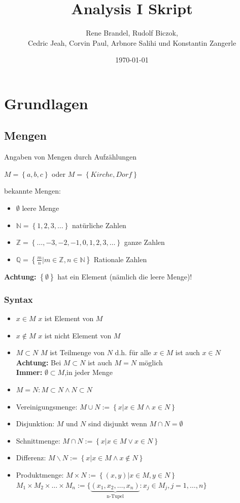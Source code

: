 \documentclass[fleqn]{scrbook}
\newcommand{\titleText}{Analysis I Skript}
\newcommand{\mainAuthor}{Rene Brandel, Rudolf Biczok, \texorpdfstring{\\}{} Cedric Jeah, Corvin Paul, Arbnore Salihi und Konstantin Zangerle}
\newcommand{\N}{\mathbb{N}}
\begin{document}
\title{\titleText}
\date{\today}
\author{\mainAuthor}
\maketitle

\newpage
\tableofcontents
\newpage

\chapter{Grundlagen}
\section{Mengen}

Angaben von Mengen durch Aufzählungen

$M=\left\{ a,b,c \right\}$ oder $M=\left\{ Kirche, Dorf\right\}$

bekannte Mengen:
\begin{itemize}
  \item $\emptyset$ leere Menge
  \item $\N = \left\{ 1,2,3,\ldots \right\}$ natürliche Zahlen
  \item $\mathbb{Z} = \left\{ \ldots,-3,-2,-1,0,1,2,3,\ldots \right\}$ ganze Zahlen
  \item $\mathbb{Q} = \left\{ \frac{m}{n}|m \in \mathbb{Z},n \in \N \right\}$ Rationale Zahlen
\end{itemize}

\textbf{Achtung:} $\left\{ \emptyset \right\}$ hat ein Element (nämlich die leere Menge)!

\subsection{Syntax}
\begin{itemize}
  \item $x \in M$ $x$ ist Element von $M$
  \item $x \notin M$ $x$ ist nicht Element von $M$
  \item $M \subset N$ $M$ ist Teilmenge von $N$
  d.h. für alle $x \in M$ ist auch $x \in N$ \\
  \textbf{Achtung:} Bei $M \subset N $ ist auch $M = N$ möglich \\
  \textbf{Immer:} $\emptyset \subset M$,in jeder Menge
  \item $M=N: M \subset N \wedge N \subset N$
  \item Vereinigungsmenge: $M \cup N := \left\{ x|x \in M \wedge x \in N\right\}$
  \item Disjunktion: $M$ und $N$ sind disjunkt wenn $M  \cap N = \emptyset$ 
  \item Schnittmenge: $M \cap N := \left\{ x|x \in M \vee x \in N\right\}$ 
  \item Differenz: $M \backslash N := \left\{ x|x \in M \wedge x \notin N \right\}$ 
  \item Produktmenge: $M \times N:= \left\{ (x,y)|x \in M, y \in N \right\}$  \\
  $M_1 \times M_2 \times \ldots \times M_n := \{ \underbrace{(x_1,x_2,\ldots,x_n)}_{\text{n-Tupel}} : x_j \in M_j, j= 1,\ldots,n \}$
\end{itemize}
\end{document}
